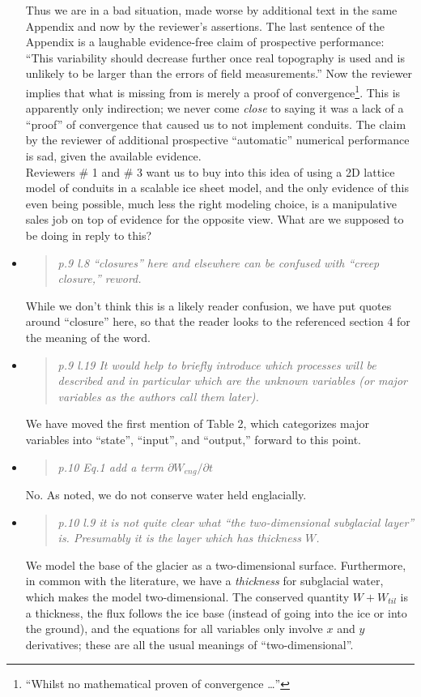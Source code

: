 \documentclass[11pt,reqno]{amsart}
\newcommand{\reply}[2]{
\medskip\medskip
\item  \begin{quote}
\emph{#1}
\end{quote}

\medskip
\noindent #2}
\begin{document}
\begin{itemize}
{\indent Thus we are in a bad situation, made worse by additional text in the same Appendix and now by the reviewer's assertions.  The last sentence of the Appendix is a laughable evidence-free claim of prospective performance: ``This variability should decrease further once real topography is used and is unlikely to be larger than the errors of field measurements.''  Now the reviewer implies that what is missing from \cite{Werderetal2013} is merely a proof of convergence\footnote{``Whilst no mathematical proven of convergence \dots''}.  This is apparently only indirection; we never come \emph{close} to saying it was a lack of a ``proof'' of convergence that caused us to not implement conduits.  The claim by the reviewer of additional prospective ``automatic'' numerical performance is sad, given the available evidence. \\
\indent Reviewers \# 1 and \# 3 want us to buy into this idea of using a 2D lattice model of conduits in a scalable ice sheet model, and the only evidence of this even being possible, much less the right modeling choice, is a manipulative sales job on top of evidence for the opposite view.  What are we supposed to be doing in reply to this?}

\reply{p.9 l.8 ``closures'' here and elsewhere can be confused with ``creep closure,'' reword.}
{While we don't think this is a likely reader confusion, we have put quotes around ``closure'' here, so that the reader looks to the referenced section 4 for the meaning of the word.}

\reply{p.9 l.19 It would help to briefly introduce which processes will be described and in
particular which are the unknown variables (or major variables as the authors call
them later).}
{We have moved the first mention of Table 2, which categorizes major variables into ``state'', ``input'', and ``output,'' forward to this point.}

\reply{p.10 Eq.1 add a term $\partial W_{eng}/\partial t$}
{No.  As noted, we do not conserve water held englacially.}

\reply{p.10 l.9 it is not quite clear what ``the two-dimensional subglacial layer'' is. Presumably it is the layer which has thickness $W$.}
{We model the base of the glacier as a two-dimensional surface.  Furthermore, in common with the literature, we have a \emph{thickness} for subglacial water, which makes the model two-dimensional.  The conserved quantity $W+W_{til}$ is a thickness, the flux follows the ice base (instead of going into the ice or into the ground), and the equations for all variables only involve $x$ and $y$ derivatives; these are all the usual meanings of ``two-dimensional''.}


\end{itemize}
\end{document}
